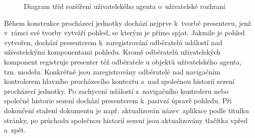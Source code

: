\begin{figure}[H]
  \begin{center}
    \caption{Diagram tříd rozšíření uživatelského agenta o~uživatelské rozhraní}
    \label{Figure.SimpleBrowserUiController}
  \end{center}
\end{figure}

\vspace{-1em}

Během konstrukce procházecí jednotky dochází nejprve k~tvorbě presenteru, jenž v~rámci své tvorby vytváří pohled, se kterým je přímo spjat. Jakmile je pohled vytvořen, dochází presenterem k~zaregistrování odběratelů událostí nad uživatelskými komponentami pohledu. Kromě odběratelů uživatelských komponent registruje presenter též odběratele u objektů uživatelského agenta, tzn. modelu. Konkrétně jsou zaregistrovány odběratelé nad navigačním kontrolerem hlavního procházecího kontextu a~nad společnou historií sezení procházecí jednotky. Po zachycení událostí z~navigačního kontroleru nebo společné historie sezení dochází presenterem k~pasivní úpravě pohledu. Při dokončení stažení dokumentu je např. aktualizován název~aplikace podle titulku stránky, po průchodu společnou historií sezení jsou aktualizovány tlačítka vpřed a~zpět.


